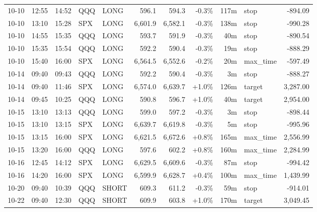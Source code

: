 \documentclass[11pt,a4paper,twoside]{article}
\begin{document}
\begin{center}
\begin{longtable}{>{\color{txtmain}}l l l l l r r r r >{\color{txtmain}}l r}
10-10 & 12:55 & 14:52 & QQQ & LONG & 596.1 & 594.3 & \textcolor{lossred}{-0.3\%} & 117m & stop & \textcolor{lossred}{-894.09} \\
10-10 & 13:10 & 15:28 & SPX & LONG & 6,601.9 & 6,582.1 & \textcolor{lossred}{-0.3\%} & 138m & stop & \textcolor{lossred}{-990.28} \\
10-10 & 14:55 & 15:35 & QQQ & LONG & 593.7 & 591.9 & \textcolor{lossred}{-0.3\%} & 40m & stop & \textcolor{lossred}{-890.54} \\
10-10 & 15:35 & 15:54 & QQQ & LONG & 592.2 & 590.4 & \textcolor{lossred}{-0.3\%} & 19m & stop & \textcolor{lossred}{-888.29} \\
10-10 & 15:40 & 16:00 & SPX & LONG & 6,564.5 & 6,552.6 & \textcolor{lossred}{-0.2\%} & 20m & max\_time & \textcolor{lossred}{-597.49} \\
10-14 & 09:40 & 09:43 & QQQ & LONG & 592.2 & 590.4 & \textcolor{lossred}{-0.3\%} & 3m & stop & \textcolor{lossred}{-888.27} \\
10-14 & 09:40 & 11:46 & SPX & LONG & 6,574.0 & 6,639.7 & \textcolor{wingreen}{+1.0\%} & 126m & target & \textcolor{wingreen}{3,287.00} \\
10-14 & 09:45 & 10:25 & QQQ & LONG & 590.8 & 596.7 & \textcolor{wingreen}{+1.0\%} & 40m & target & \textcolor{wingreen}{2,954.00} \\
10-15 & 13:10 & 13:13 & QQQ & LONG & 599.0 & 597.2 & \textcolor{lossred}{-0.3\%} & 3m & stop & \textcolor{lossred}{-898.44} \\
10-15 & 13:10 & 13:15 & SPX & LONG & 6,639.7 & 6,619.8 & \textcolor{lossred}{-0.3\%} & 5m & stop & \textcolor{lossred}{-995.96} \\
10-15 & 13:15 & 16:00 & SPX & LONG & 6,621.5 & 6,672.6 & \textcolor{wingreen}{+0.8\%} & 165m & max\_time & \textcolor{wingreen}{2,556.99} \\
10-15 & 13:20 & 16:00 & QQQ & LONG & 597.6 & 602.2 & \textcolor{wingreen}{+0.8\%} & 160m & max\_time & \textcolor{wingreen}{2,284.99} \\
10-16 & 12:45 & 14:12 & SPX & LONG & 6,629.5 & 6,609.6 & \textcolor{lossred}{-0.3\%} & 87m & stop & \textcolor{lossred}{-994.42} \\
10-16 & 14:20 & 16:00 & SPX & LONG & 6,599.9 & 6,628.7 & \textcolor{wingreen}{+0.4\%} & 100m & max\_time & \textcolor{wingreen}{1,439.99} \\
10-20 & 09:40 & 10:39 & QQQ & SHORT & 609.3 & 611.2 & \textcolor{lossred}{-0.3\%} & 59m & stop & \textcolor{lossred}{-914.01} \\
10-22 & 09:40 & 12:30 & QQQ & SHORT & 609.9 & 603.8 & \textcolor{wingreen}{+1.0\%} & 170m & target & \textcolor{wingreen}{3,049.45} \\

\end{longtable}
\end{center}
\end{document}
